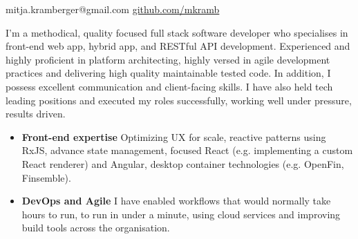 \documentclass[10pt,a4paper]{article}
\begin{document}
\sloppy  %


\nobreakvspace{0.3em}  %

\noindent
mitja.kramberger@gmail.com\sbull
\href{http://github.com/mkramb}{github.com/mkramb}


\spacedhrule{0.9em}{-0.4em}  %
\vspace{-0em}  %

\noindent I'm a methodical, quality­ focused full stack software developer who specialises in front-end web app, hybrid app, and RESTful API development. 
\noindent Experienced and highly proficient in platform architecting, highly versed in agile development practices and delivering high quality maintainable tested code. 
\noindent In addition, I possess excellent communication and client-facing skills. I have also held tech leading positions and executed my roles successfully, working well under pressure, results driven.

\spacedhrule{1.5em}{-0.4em}



\begin{indentsection}
\item
\begin{itemize}[leftmargin=0cm]
    \item \textbf{Front-end expertise} Optimizing UX for scale, reactive patterns using RxJS, advance state management, focused React (e.g. implementing a custom React renderer) and Angular, desktop container technologies (e.g. OpenFin, Finsemble).
    \item \textbf{DevOps and Agile} I have enabled workflows that would normally take hours to run, to run in under a minute, using cloud services and improving build tools across the organisation.
\end{itemize}
\end{indentsection}

\spacedhrule{0.9em}{-0.4em} 


\end{document}
